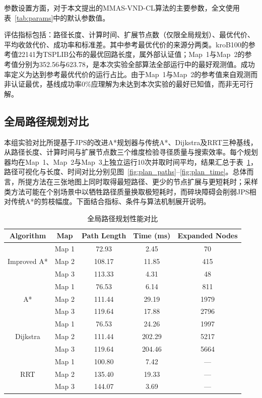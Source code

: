 \documentclass[lettersize,journal]{IEEEtran}
\begin{document}
参数设置方面，对于本文提出的MMAS-VND-CL算法的主要参数，全文使用表~\textcolor{blue}{\ref{tab:params}}中的默认参数值。

评估指标包括：路径长度、计算时间、扩展节点数（仅限全局规划）、最优代价、平均收敛代价、成功率和标准差。其中参考最优代价的来源分两类。kroB100的参考值22141为TSPLIB公布的最优回路长度，属外部认证值；Map~1与Map~2的参考值分别为352.56与623.78，是本次实验全部算法全部运行中的最好观测值。成功率定义为达到参考最优代价的运行占比。由于Map~1与Map~2的参考值来自观测而非认证最优，基线成功率0\%应理解为未达到本次实验的最好已知值，而非无可行解。
\subsection{全局路径规划对比}
\label{subsec:exp_plan}
本组实验对比所提基于JPS的改进A*规划器与传统A*、Dijkstra及RRT三种基线，从路径长度、计算时间与扩展节点数三个维度检验寻径质量与搜索效率。每个规划器均在Map~1、Map~2与Map~3上独立运行10次并取时间平均，结果汇总于表~\textcolor{blue}{\ref{tab:plan}}，路径可视化与长度、时间对比分别见图~\textcolor{blue}{\ref{fig:plan_paths}}--\textcolor{blue}{\ref{fig:plan_time}}。总体而言，所提方法在三张地图上同时取得最短路径、更少的节点扩展与更短耗时；采样类方法可能在个别场景中以牺牲路径质量换取极短耗时，而碎块障碍会削弱JPS相对传统A*的剪枝幅度。下面结合指标、条件与算法机制展开说明。

\begin{table}[!ht]
\caption{全局路径规划性能对比}
\label{tab:plan}
\centering
\footnotesize
\setlength{\tabcolsep}{4pt}
\begin{tabular}{ccccc}
\toprule
Algorithm & Map & Path Length & Time (ms) & Expanded Nodes \\
\midrule
\multirow{3}{*}{Improved A*}
& Map 1 & 72.93 & 2.45 & 70 \\
& Map 2 & 108.17 & 11.85 & 415 \\
& Map 3 & 113.33 & 4.31 & 48 \\
\midrule
\multirow{3}{*}{A*}
& Map 1 & 76.53 & 6.14 & 811 \\
& Map 2 & 111.44 & 29.19 & 1979 \\
& Map 3 & 119.64 & 17.88 & 2796 \\
\midrule
\multirow{3}{*}{Dijkstra}
& Map 1 & 76.53 & 24.26 & 1997 \\
& Map 2 & 111.44 & 202.29 & 5217 \\
& Map 3 & 119.64 & 204.46 & 5664 \\
\midrule
\multirow{3}{*}{RRT}
& Map 1 & 100.80 & 7.42 & --- \\
& Map 2 & 135.40 & 19.33 & --- \\
& Map 3 & 144.07 & 3.69 & --- \\
\bottomrule
\end{tabular}
\end{table}
\end{document}
